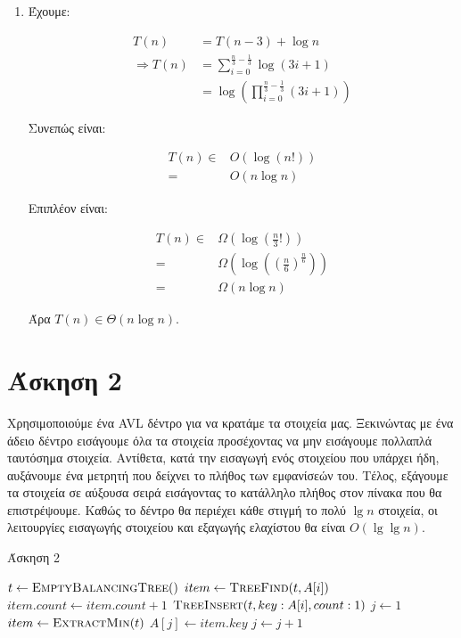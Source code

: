 \documentclass[11pt,a4paper]{book}
\begin{document}
\begin{enumerate}
\item Έχουμε:

\begin{align*}
            T( n ) &= T( n - 3 ) + \log n \\
\Rightarrow T( n ) &= \sum_{i = 0}^{\frac{n}{3} - \frac{1}{3}} \log( 3i + 1 )\\
                   &= \log( \prod_{i = 0}^{\frac{n}{3} - \frac{1}{3}} (3i + 1) )
\end{align*}

Συνεπώς είναι:

\begin{align*}
T( n ) \in & O( \log( n! ) )\\
         = & O( n \log n )
\end{align*}

Επιπλέον είναι:

\begin{align*}
T( n ) \in & \Omega( \log( \frac{n}{3}! ) ) \\
         = & \Omega( \log (( \frac{n}{6} )^{\frac{n}{6}}) ) \\
         = & \Omega( n \log n )
\end{align*}

Άρα $T( n ) \in \Theta( n \log n )$.
\end{enumerate}

\section*{Άσκηση 2}
Χρησιμοποιούμε ένα \textlatin{AVL} δέντρο για να κρατάμε τα στοιχεία μας. Ξεκινώντας με ένα άδειο δέντρο εισάγουμε όλα τα στοιχεία προσέχοντας να μην εισάγουμε πολλαπλά ταυτόσημα στοιχεία. Αντίθετα, κατά την εισαγωγή ενός στοιχείου που υπάρχει ήδη, αυξάνουμε ένα μετρητή που δείχνει το πλήθος των εμφανίσεών του. Τέλος, εξάγουμε τα στοιχεία σε αύξουσα σειρά εισάγοντας το κατάλληλο πλήθος στον πίνακα που θα επιστρέψουμε. Καθώς το δέντρο θα περιέχει κάθε στιγμή το πολύ $\lg n$ στοιχεία, οι λειτουργίες εισαγωγής στοιχείου και εξαγωγής ελαχίστου θα είναι $O( \lg \lg n )$.

\begin{algorithm}[H]
\caption{\textgreek{Άσκηση 2}}
\begin{algorithmic}[1]
    \State $t \gets \Call{EmptyBalancingTree}$
        \State $item \gets \Call{TreeFind}{t, A[ i ]}$
            \State $item.count \gets item.count + 1$
        \Else
            \State $\Call{TreeInsert}{t, key: A[ i ], count: 1}$
        \EndIf
    \EndFor
    \State $j \gets 1$
        \State $item \gets \Call{ExtractMin}{t}$
            \State $A[ j ] \gets item.key$
            \State $j \gets j + 1$
        \EndFor
    \EndWhile
\EndProcedure
\end{algorithmic}
\end{algorithm}
\end{document}
